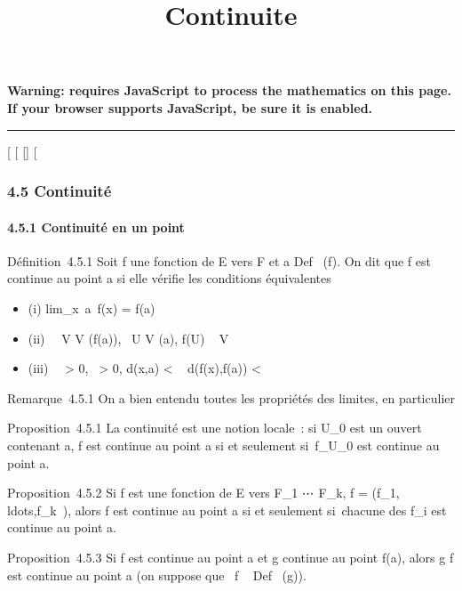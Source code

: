 \documentclass[]{article}
\title{Continuite}
\author{}
\date{}
\begin{document}
\maketitle

\textbf{Warning: 
requires JavaScript to process the mathematics on this page.\\ If your
browser supports JavaScript, be sure it is enabled.}

\begin{center}\rule{3in}{0.4pt}\end{center}

{[}
{[}
{[}{]}
{[}

\subsubsection{4.5 Continuité}

\paragraph{4.5.1 Continuité en un point}

Définition~4.5.1 Soit f une fonction de E vers F et a
\in Def~ (f). On dit que f est continue au point
a si elle vérifie les conditions équivalentes

\begin{itemize}
\itemsep1pt\parskip0pt
\item
  (i) lim\_x\rightarrow~a~f(x) = f(a)
\item
  (ii) \forall~~V \in V (f(a)),
  \exists~U \in V (a), f(U) \subset~ V
\item
  (iii) \forall~~\epsilon \textgreater{} 0,
  \exists~\eta \textgreater{} 0, d(x,a) \textless{} \eta \rigtharrow~
  d(f(x),f(a)) \textless{} \epsilon
\end{itemize}

Remarque~4.5.1 On a bien entendu toutes les propriétés des limites, en
particulier

Proposition~4.5.1 La continuité est une notion locale~: si U\_0
est un ouvert contenant a, f est continue au point a si et seulement
si~f\textbar{}\_U\_0 est continue au point a.

Proposition~4.5.2 Si f est une fonction de E vers F\_1
\times⋯ \times F\_k, f =
(f\_1,\\ldots,f\_k~),
alors f est continue au point a si et seulement si~chacune des
f\_i est continue au point a.

Proposition~4.5.3 Si f est continue au point a et g continue au point
f(a), alors g \cdot f est continue au point a (on suppose que
\mathrmIm~f
\subset~ Def~ (g)).
\end{document}
